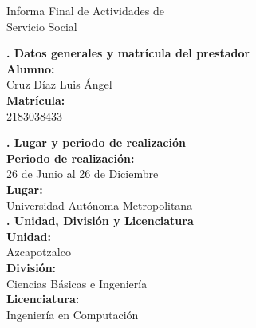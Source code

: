 \begin{center}
    \vspace{0.4cm}
    \LARGE
    Informa Final de Actividades de \\
    Servicio Social

    \vspace{1.6cm}
    \large
    \textbf{. Datos generales y matrícula del prestador} \\
    \vspace{.3cm}
    \normalsize
    \textbf{Alumno:}\\
    \vspace{.1cm}
    Cruz Díaz Luis Ángel\\
    \vspace{.3cm}
    \textbf{Matrícula:}\\
    \vspace{.1cm}
    2183038433

    \vspace{1.0cm}
    \large
    \textbf{. Lugar y periodo de realización} \\
    \vspace{.3cm}
    \normalsize
    \textbf{Periodo de realización:}\\
    \vspace{.1cm}
    26 de Junio al 26 de Diciembre\\
    \vspace{.3cm}
    \textbf{Lugar:}\\
    \vspace{.1cm}
    Universidad Autónoma Metropolitana\\

    \vspace{1.0cm}
    \large
    \textbf{. Unidad, División y Licenciatura} \\
    \vspace{.3cm}
    \normalsize
    \textbf{Unidad:}\\
    \vspace{.1cm}
    Azcapotzalco\\
    \vspace{.3cm}
    \textbf{División:}\\
    \vspace{.1cm}
    Ciencias Básicas e Ingeniería\\
    \vspace{.3cm}
    \textbf{Licenciatura:}\\
    \vspace{.1cm}
    Ingeniería en Computación\\


\end{center}
